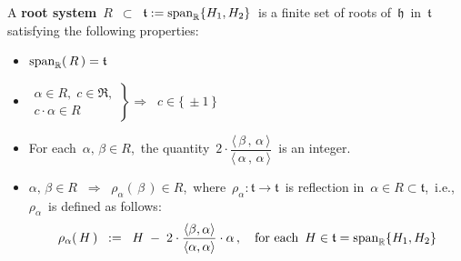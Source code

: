 \vskip 0.5cm
\begin{definition}[Root system in
\,$\mathfrak{t} \,:=\, \span_{\Re}\{H_{1},H_{2}\} \,\subset\, \mathfrak{h} \,:=\, \span_{\C}\{H_{1},H_{2}\} \,\subset\, \sl(3,\C)$]
\mbox{}
\vskip 0.05cm
\noindent
A \textbf{root system} \,$R$\, $\subset$ \,$\mathfrak{t} := \textnormal{span}_{\mathbb{R}}\{H_{1},H_{2}\}$\,
is a finite set of roots of \,$\mathfrak{h}$\, in \,$\mathfrak{t}$\,
satisfying the following properties:
\begin{itemize}
\item
    $\textnormal{span}_{\mathbb{R}}(\,R\,) = \mathfrak{t}$
\item
    $
    \left.\begin{array}{c}
        \alpha \in R,\; c \in \Re,
        \\
        c \cdot \alpha \in R
        \end{array}\right\}
    \!\!\Longrightarrow\;\;
    c \in \{\,\pm 1\,\}
    $
\item
    For each \,$\alpha,\, \beta \in R$,\, the quantity
    \,$2 \cdot \dfrac{\langle\,\beta\,,\,\alpha\,\rangle}{\langle\,\alpha\,,\,\alpha\,\rangle}$\,
    is an integer.
\item
    $
    \alpha,\, \beta \in R
    \;\;\Longrightarrow\;\;
    \rho_{\alpha}(\,\beta\,) \in R
    $,\,
    where
    \,$\rho_{\alpha} : \mathfrak{t} \longrightarrow \mathfrak{t}$\,
    is reflection in \,$\alpha \in R \subset \mathfrak{t}$,\,
    i.e., \,$\rho_{\alpha}$\, is defined as follows:
    \begin{equation*}
    \rho_{\alpha}(\,H\,)
    \;\; := \;\;
        H
        \;-\;
        2 \cdot
        \dfrac{
            \langle \beta,\alpha \rangle
            }{
            \langle \alpha,\alpha \rangle
            }
        \cdot \alpha\,,
    \quad
    \textnormal{for each \,$H \in \mathfrak{t} = \textnormal{span}_{\mathbb{R}}\{H_{1},H_{2}\}$}
    \end{equation*}
\end{itemize}
\end{definition}


